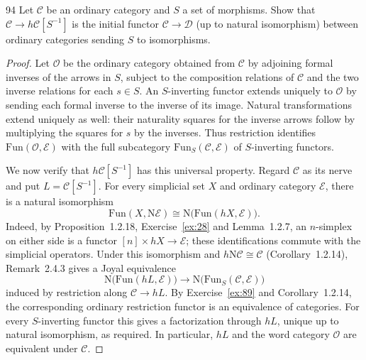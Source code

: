 \begin{exercise}{94}
Let $\mathcal C$ be an ordinary category and $S$ a set of morphisms. Show that
$\mathcal C\to h\mathcal C[S^{-1}]$ is the initial functor $\mathcal C\to\mathcal D$
(up to natural isomorphism) between ordinary categories sending $S$ to isomorphisms.

\begin{proof}
Let $\mathcal O$ be the ordinary category obtained from $\mathcal C$ by adjoining
formal inverses of the arrows in $S$, subject to the composition relations of
$\mathcal C$ and the two inverse relations for each $s\in S$.
An $S$-inverting functor extends uniquely to $\mathcal O$ by sending each
formal inverse to the inverse of its image.
Natural transformations extend uniquely as well: their naturality squares for
the inverse arrows follow by multiplying the squares for $s$ by the inverses.
Thus restriction identifies $\mathrm{Fun}(\mathcal O,\mathcal E)$ with the
full subcategory $\mathrm{Fun}_S(\mathcal C,\mathcal E)$ of $S$-inverting functors.

We now verify that $h\mathcal C[S^{-1}]$ has this universal property.
Regard $\mathcal C$ as its nerve and put $L=\mathcal C[S^{-1}]$.
For every simplicial set $X$ and ordinary category $\mathcal E$, there is a
natural isomorphism
\[
 \mathrm{Fun}(X,\mathrm N\mathcal E)
 \cong\mathrm N\bigl(\mathrm{Fun}(hX,\mathcal E)\bigr).
\]
Indeed, by Proposition~1.2.18, Exercise~\ref{ex:28} and Lemma~1.2.7,
an $n$-simplex on either side is a functor $[n]\times hX\to\mathcal E$;
these identifications commute with the simplicial operators.
Under this isomorphism and $h\mathrm N\mathcal C\cong\mathcal C$
(Corollary~1.2.14), Remark~2.4.3 gives a Joyal equivalence
\[
 \mathrm N\bigl(\mathrm{Fun}(hL,\mathcal E)\bigr)
 \longrightarrow\mathrm N\bigl(\mathrm{Fun}_S(\mathcal C,\mathcal E)\bigr)
\]
induced by restriction along $\mathcal C\to hL$.
By Exercise~\ref{ex:89} and Corollary~1.2.14, the corresponding ordinary
restriction functor is an equivalence of categories.
For every $S$-inverting functor this gives a factorization through $hL$,
unique up to natural isomorphism, as required.
In particular, $hL$ and the word category $\mathcal O$ are equivalent under
$\mathcal C$.
\end{proof}
\end{exercise}
